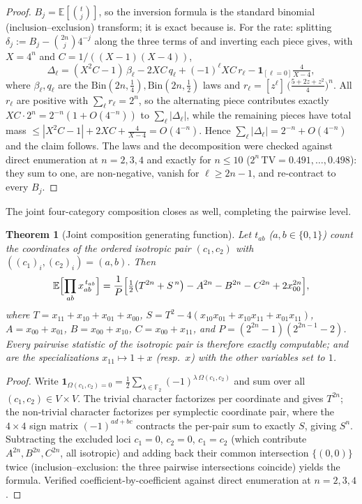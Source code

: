 \documentclass[11pt,a4paper]{article}
\theoremstyle{plain}
\newtheorem{theorem}{Theorem}[section]
\theoremstyle{definition}
\newcommand{\F}{\mathbb{F}}
\newcommand{\E}{\mathbb{E}}
\begin{document}
\begin{proof}
$B_j = \E[\binom{t}{j}]$, so the inversion formula is the standard binomial (inclusion--exclusion) transform; it is exact because  is. For the rate: splitting $\delta_j := B_j - \binom{2n}{j}4^{-j}$ along the three terms of  and inverting each piece gives, with $X = 4^n$ and $C = 1/((X-1)(X-4))$,
\[
\Delta_\ell = (X^2C - 1)\,\beta_\ell - 2XC\,q_\ell + (-1)^\ell XC\,r_\ell - \mathbf 1_{[\ell=0]}\tfrac{4}{X-4},
\]
where $\beta_\ell, q_\ell$ are the $\mathrm{Bin}(2n,\tfrac14), \mathrm{Bin}(2n,\tfrac12)$ laws and $r_\ell = [z^\ell]\,\bigl(\tfrac{5+2z+z^2}{4}\bigr)^n$. All $r_\ell$ are positive with $\sum_\ell r_\ell = 2^n$, so the alternating piece contributes exactly $XC \cdot 2^n = 2^{-n}(1+O(4^{-n}))$ to $\sum_\ell|\Delta_\ell|$, while the remaining pieces have total mass $\le |X^2C-1| + 2XC + \tfrac{4}{X-4} = O(4^{-n})$. Hence $\sum_\ell |\Delta_\ell| = 2^{-n} + O(4^{-n})$ and the claim follows. The laws and the decomposition were checked against direct enumeration at $n = 2, 3, 4$ and exactly for $n \le 10$ ($2^n\,\mathrm{TV} = 0.491, \dots, 0.498$): they sum to one, are non-negative, vanish for $\ell \ge 2n-1$, and re-contract to every $B_j$.
\end{proof}

The joint four-category composition closes as well, completing the pairwise level.

\begin{theorem}[Joint composition generating function]
\label{thm:joint-gf}
Let $t_{ab}$ ($a,b \in \{0,1\}$) count the coordinates of the ordered isotropic pair $(c_1, c_2)$ with $((c_1)_i, (c_2)_i) = (a,b)$. Then
\[
\E\Bigl[\prod_{ab} x_{ab}^{\,t_{ab}}\Bigr]
= \frac{1}{P}\Bigl[\tfrac12\bigl(T^{2n} + S^{\,n}\bigr) - A^{2n} - B^{2n} - C^{2n} + 2x_{00}^{2n}\Bigr],
\]
where $T = x_{11}+x_{10}+x_{01}+x_{00}$, $S = T^2 - 4(x_{10}x_{01} + x_{10}x_{11} + x_{01}x_{11})$, $A = x_{00}+x_{01}$, $B = x_{00}+x_{10}$, $C = x_{00}+x_{11}$, and $P = (2^{2n}-1)(2^{2n-1}-2)$. Every pairwise statistic of the isotropic pair is therefore exactly computable;  and  are the specializations $x_{11} \mapsto 1+x$ (resp.\ $x$) with the other variables set to $1$.
\end{theorem}

\begin{proof}
Write $\mathbf 1_{\Omega(c_1,c_2)=0} = \tfrac12\sum_{\lambda \in \F_2}(-1)^{\lambda\,\Omega(c_1,c_2)}$ and sum over all $(c_1, c_2) \in V \times V$. The trivial character factorizes per coordinate and gives $T^{2n}$; the non-trivial character factorizes per symplectic coordinate pair, where the $4\times4$ sign matrix $(-1)^{a d + b c}$ contracts the per-pair sum to exactly $S$, giving $S^n$. Subtracting the excluded loci $c_1 = 0$, $c_2 = 0$, $c_1 = c_2$ (which contribute $A^{2n}, B^{2n}, C^{2n}$, all isotropic) and adding back their common intersection $\{(0,0)\}$ twice (inclusion--exclusion: the three pairwise intersections coincide) yields the formula. Verified coefficient-by-coefficient against direct enumeration at $n = 2, 3, 4$.
\end{proof}
\end{document}
